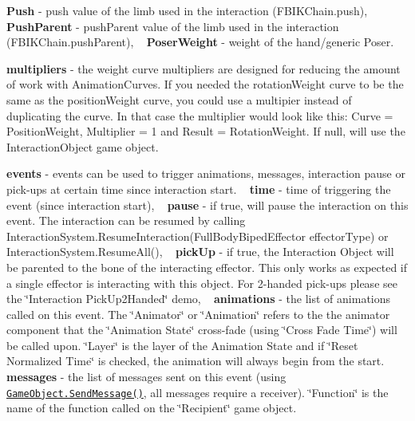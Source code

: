 \begin{DoxyItemize}
{\bfseries Push} -\/ push value of the limb used in the interaction (F\+B\+I\+K\+Chain.\+push), ~\newline
{\bfseries Push\+Parent} -\/ push\+Parent value of the limb used in the interaction (F\+B\+I\+K\+Chain.\+push\+Parent), ~\newline
{\bfseries Poser\+Weight} -\/ weight of the hand/generic Poser.
\item {\bfseries multipliers} -\/ the weight curve multipliers are designed for reducing the amount of work with Animation\+Curves. If you needed the rotation\+Weight curve to be the same as the position\+Weight curve, you could use a multipier instead of duplicating the curve. In that case the multiplier would look like this\+: Curve = Position\+Weight, Multiplier = 1 and Result = Rotation\+Weight. If null, will use the Interaction\+Object game object.
\item {\bfseries events} -\/ events can be used to trigger animations, messages, interaction pause or pick-\/ups at certain time since interaction start. ~\newline
{\bfseries time} -\/ time of triggering the event (since interaction start), ~\newline
{\bfseries pause} -\/ if true, will pause the interaction on this event. The interaction can be resumed by calling Interaction\+System.\+Resume\+Interaction(\+Full\+Body\+Biped\+Effector effector\+Type) or Interaction\+System.\+Resume\+All(), ~\newline
{\bfseries pick\+Up} -\/ if true, the Interaction Object will be parented to the bone of the interacting effector. This only works as expected if a single effector is interacting with this object. For 2-\/handed pick-\/ups please see the \char`\"{}\+Interaction Pick\+Up2\+Handed\char`\"{} demo, ~\newline
{\bfseries animations} -\/ the list of animations called on this event. The \char`\"{}\+Animator\char`\"{} or \char`\"{}\+Animation\char`\"{} refers to the the animator component that the \char`\"{}\+Animation State\char`\"{} cross-\/fade (using \char`\"{}\+Cross Fade Time\char`\"{}) will be called upon. \char`\"{}\+Layer\char`\"{} is the layer of the Animation State and if \char`\"{}\+Reset Normalized Time\char`\"{} is checked, the animation will always begin from the start. ~\newline
{\bfseries messages} -\/ the list of messages sent on this event (using \href{http://docs.unity3d.com/ScriptReference/GameObject.SendMessage.html}{\tt Game\+Object.\+Send\+Message()}, all messages require a receiver). \char`\"{}\+Function\char`\"{} is the name of the function called on the \char`\"{}\+Recipient\char`\"{} game object.
\end{DoxyItemize}



